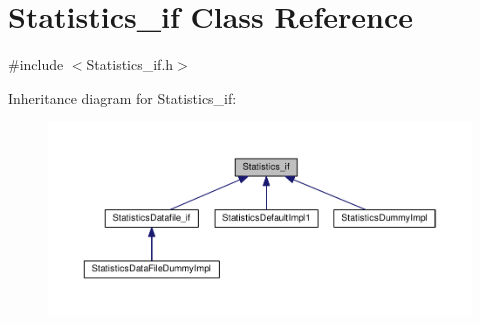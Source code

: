 \hypertarget{class_statistics__if}{}\section{Statistics\+\_\+if Class Reference}
\label{class_statistics__if}


{\ttfamily \#include $<$Statistics\+\_\+if.\+h$>$}



Inheritance diagram for Statistics\+\_\+if\+:\nopagebreak
\begin{figure}[H]
\begin{center}
\leavevmode
\includegraphics[width=350pt]{class_statistics__if__inherit__graph}
\end{center}
\end{figure}
